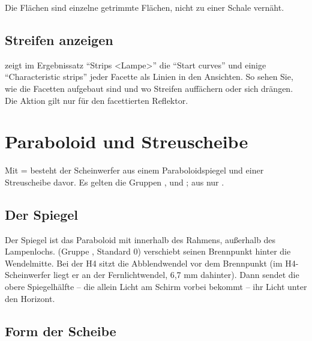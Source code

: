 Die Flächen sind einzelne getrimmte Flächen, nicht zu einer Schale vernäht.

\subsection{Streifen anzeigen}

 zeigt im Ergebnissatz \enquote{Strips <Lampe>} die \enquote{Start curves} und
einige \enquote{Characteristic strips} jeder Facette als Linien in den Ansichten. So sehen Sie, wie die
Facetten aufgebaut sind und wo Streifen auffächern oder sich drängen. Die Aktion gilt nur für den
facettierten Reflektor.

\section{Paraboloid und Streuscheibe}\label{sec:al-streuscheibe}

Mit  =  besteht der Scheinwerfer aus einem
Paraboloidspiegel und einer Streuscheibe davor. Es gelten die Gruppen ,  und
; aus  nur .

\subsection{Der Spiegel}

Der Spiegel ist das Paraboloid mit  innerhalb des Rahmens, außerhalb des
Lampenlochs.  (Gruppe , Standard 0) verschiebt
seinen Brennpunkt hinter die Wendelmitte. Bei der H4 sitzt die Abblendwendel vor dem Brennpunkt
(im H4-Scheinwerfer liegt er an der Fernlichtwendel, 6,7 mm dahinter). Dann sendet die obere
Spiegelhälfte -- die allein Licht am Schirm vorbei bekommt -- ihr Licht unter den Horizont.

\subsection{Form der Scheibe}

